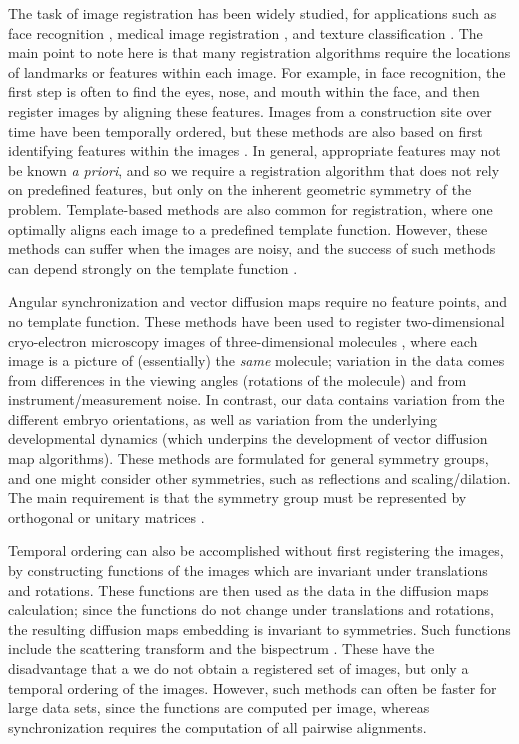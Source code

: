 \documentclass{pnastwo}
\begin{document}
\begin{article}
The task of image registration has been widely studied, for applications such as face recognition \cite{rowley1998rotation}, medical image registration \cite{hajnal2010medical}, and texture classification \cite{greenspan1994rotation}.
%
The main point to note here is that many registration algorithms require the locations of landmarks or features within each image.
%
For example, in face recognition, the first step is often to find the eyes, nose, and mouth within the face, and then register images by aligning these features.
%
Images from a construction site over time have been temporally ordered, but these methods are also based on first identifying features within the images \cite{schindler2007inferring}.
%
In general, appropriate features may not be known {\em a priori}, and so we require a registration algorithm that does not rely on predefined features, but only on the inherent geometric symmetry of the problem.
%
Template-based methods are also common for registration, where one optimally aligns each image to a predefined template function.
%
However, these methods can suffer when the images are noisy, and the success of such methods can depend strongly on the template function \cite{shatsky2009method}.

Angular synchronization and vector diffusion maps require no feature points, and no template function.
%
These methods have been used to register two-dimensional cryo-electron microscopy images of three-dimensional molecules \cite{singer2011three}, where each image is a picture of (essentially) the {\em same} molecule; variation in the data comes from differences in the viewing angles (rotations of the molecule) and from instrument/measurement noise.
%
In contrast, our data contains variation from the different embryo orientations, as well as variation from the underlying developmental dynamics (which underpins the development of vector diffusion map algorithms).
%
%
These methods are formulated for general symmetry groups, and one might consider other symmetries, such as reflections and scaling/dilation.
%
The main requirement is that the symmetry group must be represented by orthogonal or unitary matrices \cite{singer2013spectral}.

Temporal ordering can also be accomplished without first registering the images, by constructing functions of the images which are invariant under translations and rotations. 
%
These functions are then used as the data in the diffusion maps calculation; since the functions do not change under translations and rotations, the resulting diffusion maps embedding is invariant to symmetries.
%
Such functions include the scattering transform \cite{mallat2012group} and the bispectrum \cite{zhao2014rotationally}.
%
These have the disadvantage that a we do not obtain a registered set of images, but only a temporal ordering of the images.
%
However, such methods can often be faster for large data sets, since the functions are computed per image, whereas synchronization requires the computation of all pairwise alignments.


\end{article}
\end{document}
